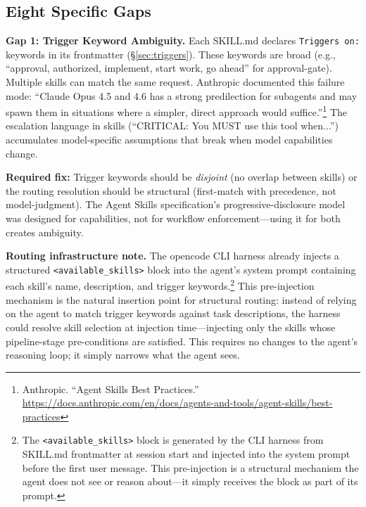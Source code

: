 \documentclass[11pt,a4paper]{article}
\begin{document}
\subsection{Eight Specific Gaps}

\begin{gapbox}
\textbf{Gap 1: Trigger Keyword Ambiguity.}  Each SKILL.md declares \texttt{Triggers on:} keywords in its frontmatter (\S\ref{sec:triggers}).  These keywords are broad (e.g., ``approval, authorized, implement, start work, go ahead'' for approval-gate).  Multiple skills can match the same request.  Anthropic documented this failure mode: ``Claude Opus 4.5 and 4.6 has a strong predilection for subagents and may spawn them in situations where a simpler, direct approach would suffice.''\footnote{Anthropic.  ``Agent Skills Best Practices.''  \url{https://docs.anthropic.com/en/docs/agents-and-tools/agent-skills/best-practices}}  The escalation language in skills (``CRITICAL: You MUST use this tool when...'') accumulates model-specific assumptions that break when model capabilities change.

\textbf{Required fix:}  Trigger keywords should be \emph{disjoint} (no overlap between skills) or the routing resolution should be structural (first-match with precedence, not model-judgment).  The Agent Skills specification's progressive-disclosure model was designed for capabilities, not for workflow enforcement---using it for both creates ambiguity.

\textbf{Routing infrastructure note.}  The opencode CLI harness already injects a structured \texttt{<available\_skills>} block into the agent's system prompt containing each skill's name, description, and trigger keywords.\footnote{The \texttt{<available\_skills>} block is generated by the CLI harness from SKILL.md frontmatter at session start and injected into the system prompt before the first user message.  This pre-injection is a structural mechanism the agent does not see or reason about---it simply receives the block as part of its prompt.}  This pre-injection mechanism is the natural insertion point for structural routing: instead of relying on the agent to match trigger keywords against task descriptions, the harness could resolve skill selection at injection time---injecting only the skills whose pipeline-stage pre-conditions are satisfied.  This requires no changes to the agent's reasoning loop; it simply narrows what the agent sees.
\end{gapbox}
\end{document}
